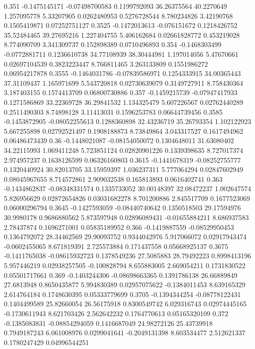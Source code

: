 {0.351 -0.1475145171 -0.07498700583 0.1199792093 36.26375564 40.2270649 1.257095778 5.33207905 0.0262480953 0.5276728544 8.780234826 3.42190768 0.1505419871 0.07252751127
0.3525 -0.1472013613 -0.076151672 0.1218426752 35.52484465 39.27695216 1.227404755 5.406162684 0.02661828772 0.453219028 8.774090709 3.341309737 0.152898389 0.0710496893
0.354 -0.1468303499 -0.0772881711 0.1236610738 34.77108939 38.30444981 1.197014056 5.47670661 0.02697104539 0.3823223447 8.766811465 3.263133809 0.1551986272 0.06954217878
0.3555 -0.1464031786 -0.07839586971 0.1254333915 34.00365443 37.31109437 1.165971699 5.543720818 0.02730639079 0.3149727911 8.758430364 3.187403155 0.1574413709 0.06800730886
0.357 -0.1459215739 -0.07947417933 0.1271586869 33.22369728 36.29841532 1.134325479 5.607226567 0.02762440289 0.2511490303 8.74898128 3.11413031 0.1596253783 0.06644739456
0.3585 -0.1453872905 -0.08052255613 0.1288360898 32.43236719 35.26793354 1.102122923 5.667255898 0.02792521497 0.1908188873 8.73849864 3.043317527 0.1617494962 0.06486473439
0.36 -0.1448021087 -0.08154050072 0.1304648011 31.63080402 34.22115993 1.069411248 5.723851124 0.02820901226 0.1339398635 8.727017374 2.974957237 0.1638126599 0.06326160803
0.3615 -0.1441678319 -0.08252755777 0.1320440924 30.82013705 33.15959397 1.036237311 5.777064294 0.02847602949 0.08045967655 8.714572861 2.909032538 0.165813893 0.0616402741
0.363 -0.1434862837 -0.08348331574 0.1335733052 30.00148397 32.08472237 1.002647574 5.826956629 0.02872654826 0.03031682278 8.701200886 2.845517709 0.1677523069 0.06000296794
0.3645 -0.1427593059 -0.08440740642 0.1350518503 29.17594976 30.9980178 0.9686880562 5.873597948 0.02896089431 -0.01655884211 8.686937583 2.78437874 0.1696271001 0.05835189952
0.366 -0.1419887559 -0.08529950453 0.1364792072 28.34462569 29.90093752 0.9344042976 5.917066072 0.02917943474 -0.0602455065 8.671819391 2.725573884 0.171437558 0.05668925137
0.3675 -0.1411765038 -0.08615932723 0.1378549236 27.5085883 28.79492223 0.8998413196 5.957446219 0.02938257505 -0.100828794 8.655883005 2.669054211 0.1731830522 0.05501717661
0.369 -0.1403244306 -0.08698663365 0.1391786138 26.66889849 27.6813948 0.8650435877 5.994830389 0.02957075622 -0.1384011453 8.639165329 2.614764184 0.1748630395 0.05333779699
0.3705 -0.1394344254 -0.08778122431 0.1404499589 25.82660054 26.56175918 0.8300549742 6.029316743 0.02974445165 -0.1730611943 8.621703426 2.562642232 0.1764770613 0.05165320109
0.372 -0.1385083831 -0.08854294059 0.1416687049 24.98272126 25.43739918 0.7949187243 6.061008976 0.0299041641 -0.2049131398 8.603534477 2.512621337 0.1780247429 0.04996544251
}
